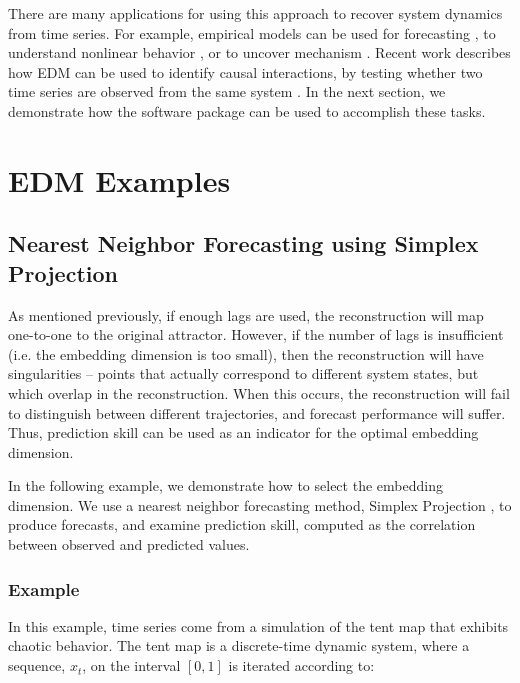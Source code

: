 \documentclass[article]{jss}
\begin{document}
There are many applications for using this approach to recover system dynamics from time series. For example, empirical models can be used for forecasting \citep{Sugihara_1990}, to understand nonlinear behavior \citep{Sugihara_1994}, or to uncover mechanism \citep{Dixon_1999}. Recent work describes how EDM can be used to identify causal interactions, by testing whether two time series are observed from the same system \citep{Sugihara_2012}. In the next section, we demonstrate how the  software package can be used to accomplish these tasks.

\section{EDM Examples}\label{sec:EDM-examples}

\subsection{Nearest Neighbor Forecasting using Simplex Projection}\label{sec:nearest-neighbor-forecasting}

As mentioned previously, if enough lags are used, the reconstruction will map one-to-one to the original attractor. However, if the number of lags is insufficient (i.e. the embedding dimension is too small), then the reconstruction will have singularities -- points that actually correspond to different system states, but which overlap in the reconstruction. When this occurs, the reconstruction will fail to distinguish between different trajectories, and forecast performance will suffer. Thus, prediction skill can be used as an indicator for the optimal embedding dimension.

In the following example, we demonstrate how to select the embedding dimension. We use a nearest neighbor forecasting method, Simplex Projection \citep{Sugihara_1990}, to produce forecasts, and examine prediction skill, computed as the correlation between observed and predicted values.

\subsubsection{Example}\label{sec:simplex-example}

In this example, time series come from a simulation of the tent map that exhibits chaotic behavior. The tent map is a discrete-time dynamic system, where a sequence, $x_t$, on the interval $[0, 1]$ is iterated according to:
\end{document}
